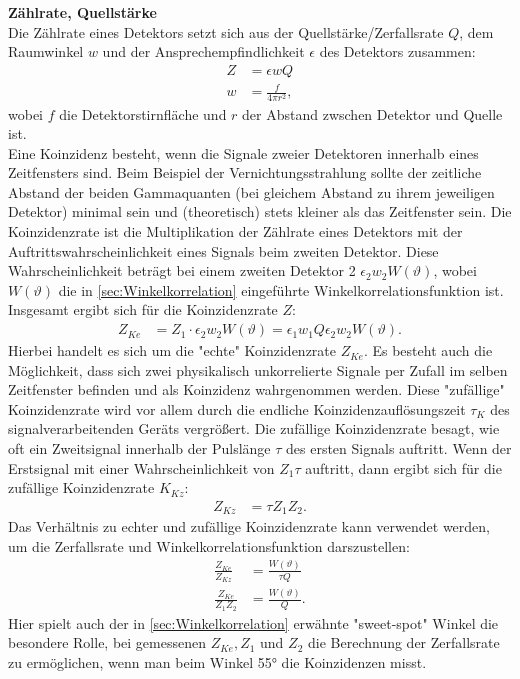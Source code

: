 \documentclass[%
aps,
onecolumn,
11pt,
tightenlines,
nofootinbib,
superscriptaddress,
floatfix,
prd,
]{revtex4-2}
\begin{document}
\vspace{15pt}
\noindent \textbf{Zählrate, Quellstärke}\\
Die Zählrate eines Detektors setzt sich aus der Quellstärke/Zerfallsrate $Q$, dem Raumwinkel $w$ und der Ansprechempfindlichkeit $\epsilon$ des Detektors zusammen:
\begin{align}
	Z &= \epsilon w Q \\
	w &= \frac{f}{4 \pi r^2} \nonumber,
\end{align}
wobei $f$ die Detektorstirnfläche und $r$ der Abstand zwschen Detektor und Quelle ist. \\
Eine Koinzidenz besteht, wenn die Signale zweier Detektoren innerhalb eines Zeitfensters sind. Beim Beispiel der Vernichtungsstrahlung sollte der zeitliche Abstand der beiden Gammaquanten (bei gleichem Abstand zu ihrem jeweiligen Detektor) minimal sein und (theoretisch) stets kleiner als das Zeitfenster sein. Die Koinzidenzrate ist die Multiplikation der Zählrate eines Detektors mit der Auftrittswahrscheinlichkeit eines Signals beim zweiten Detektor. Diese Wahrscheinlichkeit beträgt bei einem zweiten Detektor 2 $\epsilon_2w_2W(\vartheta)$, wobei $W(\vartheta)$ die in \ref{sec:Winkelkorrelation} eingeführte Winkelkorrelationsfunktion ist. Insgesamt ergibt sich für die Koinzidenzrate $Z$:
\begin{align}
	Z_{Ke} &= Z_1 \cdot \epsilon_2w_2W(\vartheta) = \epsilon_1 w_1 Q \epsilon_2 w_2 W(\vartheta).
\end{align}
Hierbei handelt es sich um die "echte" Koinzidenzrate $Z_{Ke}$. Es besteht auch die Möglichkeit, dass sich zwei physikalisch unkorrelierte Signale per Zufall im selben Zeitfenster befinden und als Koinzidenz wahrgenommen werden. Diese "zufällige" Koinzidenzrate wird vor allem durch die endliche Koinzidenzauflösungszeit $\tau_K$ des signalverarbeitenden Geräts vergrößert. Die zufällige Koinzidenzrate besagt, wie oft ein Zweitsignal innerhalb der Pulslänge $\tau$ des ersten Signals auftritt. Wenn der Erstsignal mit einer Wahrscheinlichkeit von $Z_1 \tau$ auftritt, dann ergibt sich für die zufällige Koinzidenzrate $K_{Kz}$:
\begin{align}
	Z_{Kz} &= \tau Z_1 Z_2.
\end{align}
Das Verhältnis zu echter und zufällige Koinzidenzrate kann verwendet werden, um die Zerfallsrate und Winkelkorrelationsfunktion darszustellen:
\begin{align}
	\frac{Z_{Ke}}{Z_{Kz}} &= \frac{W(\vartheta)}{\tau Q} \\
	\frac{Z_{Ke}}{Z_1Z_2} &= \frac{W(\vartheta)}{Q}. \label{eq:qvalue}
\end{align}
Hier spielt auch der in \ref{sec:Winkelkorrelation} erwähnte "sweet-spot" Winkel die besondere Rolle, bei gemessenen $Z_{Ke}, Z_1$ und $Z_2$ die Berechnung der Zerfallsrate zu ermöglichen, wenn man beim Winkel 55° die Koinzidenzen misst.
\end{document}
